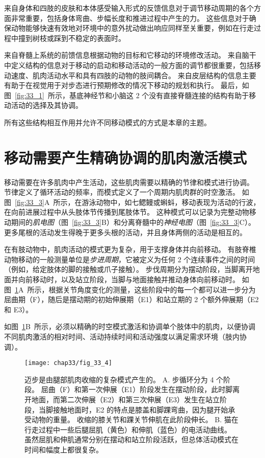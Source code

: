 来自身体和四肢的皮肤和本体感受输入形式的反馈信息对于调节移动周期的各个方面非常重要，包括身体弯曲、步幅长度和推进过程中产生的力。
这些信息对于确保动物能够快速有效地对环境中的意外扰动做出响应同样至关重要，例如在行走过程中撞到树枝或踩到不稳定的表面时。


来自脊髓上系统的前馈信息根据动物的目标和它移动的环境修改活动。
来自脑干中定义结构的信息对于移动的启动和移动活动的一般方面的调节都很重要，包括移动速度、肌肉活动水平和具有四肢的动物的肢间耦合。
来自皮层结构的信息主要有助于在视觉用于对步态进行预期修改的情况下移动的规划和执行。
最后，如图~\ref{fig:33_1}~所示，基底神经节和小脑这 2 个没有直接脊髓连接的结构有助于移动活动的选择及其协调。


所有这些结构相互作用并允许不同移动模式的方式是本章的主题。



\section{移动需要产生精确协调的肌肉激活模式}

移动需要在许多肌肉中产生活动，这些肌肉需要以精确的节律和模式进行协调。
节律定义了循环活动的频率，而模式定义了一个周期内肌肉群的时空激活。
如图~\ref{fig:33_3}A~所示，在游泳动物中，如七鳃鳗或蝌蚪，移动表现为活动的行波，在向前进展过程中从头肢体节传播到尾肢体节。
这种模式可以记录为完整动物移动期间的\textit{肌电图}（图~\ref{fig:33_3}B）和分离脊髓中的\textit{神经电图}（图~\ref{fig:33_3}C）。
更多尾根的活动发生得晚于更多头根的活动，并且身体两侧的活动是相互的。


在有肢动物中，肌肉活动的模式更为复杂，用于支撑身体并向前移动。
有肢脊椎动物移动的一般测量单位是\textit{步进周期}，它被定义为任何 2 个连续事件之间的时间（例如，给定肢体的脚的接触或爪子接触）。
步伐周期分为摆动阶段，当脚离开地面并向前移动时，以及站立阶段，当脚与地面接触并推动身体向前移动时。
如图~\ref{fig:33_4}A~所示，根据关节角度变化的测量，这些阶段中的每一个都可以进一步分为屈曲期（F），随后是摆动期的初始伸展期（E1）和站立期的 2 个额外伸展期（E2 和 E3）。


如图~\ref{fig:33_4}B~所示，必须以精确的时空模式激活和协调单个肢体中的肌肉，以便协调不同肌肉激活的相对时间、活动持续时间和活动强度以满足需求环境（肢内协调）。


\begin{figure}[htbp]
	\centering
	\texttt{[image: chap33/fig\_33\_4]}
	\caption{迈步是由腿部肌肉收缩的复杂模式产生的。
	A. 步循环分为 4 个阶段。
	屈曲（F）和第一次伸展（E1）阶段发生在摆动阶段，此时脚离开地面，而第二次伸展（E2）和第三次伸展（E3）发生在站立阶段，当脚接触地面时，E2 的特点是膝盖和脚踝弯曲，因为腿开始承受动物的重量。
	收缩的膝关节和踝关节伸肌在此阶段伸长\cite{engberg1969electromyographic}。
	B. 猫在行走过程中一些后腿屈肌（黄色）和伸肌（蓝色）的电活动曲线。
	虽然屈肌和伸肌通常分别在摆动和站立阶段活跃，但总体活动模式在时间和幅度上都很复杂。}
	\label{fig:33_4}
\end{figure}


